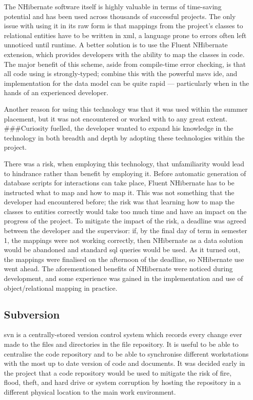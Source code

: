 \documentclass{l4proj}
\newcommand{\revisit}{\#\#\#}
\begin{document}
The NHibernate software itself is highly valuable in terms of time-saving potential and has been used across thousands of successful projects\cite{NhUse}.  The only issue with using it in its raw form is that mappings from the project's classes to relational entities have to be written in \gls{xml}, a language prone to errors often left unnoticed until runtime.  A better solution is to use the Fluent NHibernate extension, which provides developers with the ability to map the classes in code.  The major benefit of this scheme, aside from compile-time error checking, is that all code using is strongly-typed; combine this with the powerful \gls{msvs} \gls{ide}, and implementation for the data model can be quite rapid --- particularly when in the hands of an experienced developer.

Another reason for using this technology was that it was used within the summer placement, but it was not encountered or worked with to any great extent.  \revisit Curiosity fuelled, the developer wanted to expand his knowledge in the technology in both breadth and depth by adopting these technologies within the project.

There was a risk, when employing this technology, that unfamiliarity would lead to hindrance rather than benefit by employing it.  Before automatic generation of database scripts for interactions can take place, Fluent NHibernate has to be instructed what to map and how to map it.  This was not something that the developer had encountered before; the risk was that learning how to map the classes to entities correctly would take too much time and have an impact on the progress of the project.  To mitigate the impact of the risk, a deadline was agreed between the developer and the supervisor: if, by the final day of term in semester 1, the mappings were not working correctly, then NHibernate as a data solution would be abandoned and standard \gls{sql} queries would be used.  As it turned out, the mappings were finalised on the afternoon of the deadline, so NHibernate use went ahead.  The aforementioned benefits of NHibernate were noticed during development, and some experience was gained in the implementation and use of object/relational mapping in practice.

\subsection{Subversion}
\label{svn}
\gls{svn} is a centrally-stored version control system which records every change ever made to the files and directories in the file repository\cite{CFP04c1}.  It is useful to be able to centralise the code repository and to be able to synchronise different workstations with the most up to date version of code and documents.  It was decided early in the project that a code repository would be used to mitigate the risk of fire, flood, theft, and hard drive or system corruption by hosting the repository in a different physical location to the main work environment.  
\end{document}
